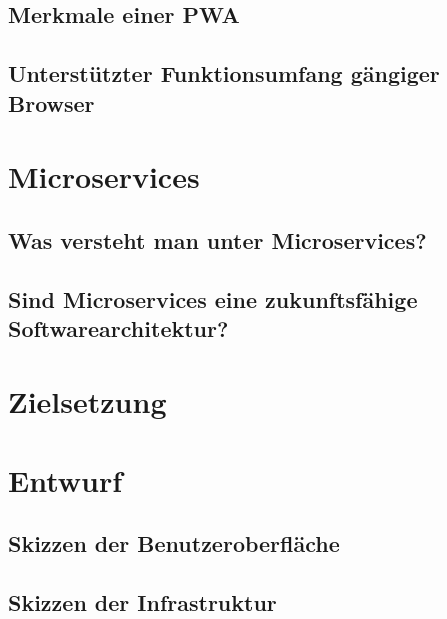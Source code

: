 
\subsection{Merkmale einer PWA}

\subsection{Unterstützter Funktionsumfang gängiger Browser}

\section{Microservices}

\subsection{Was versteht man unter Microservices?}

\subsection{Sind Microservices eine zukunftsfähige Softwarearchitektur?}

\section{Zielsetzung}

\section{Entwurf}

\subsection{Skizzen der Benutzeroberfläche}
\subsection{Skizzen der Infrastruktur}
